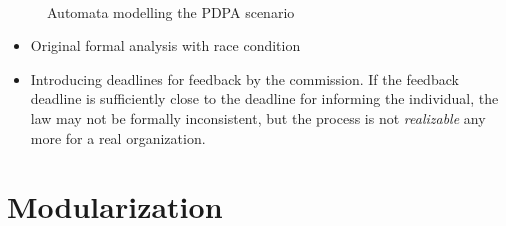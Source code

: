 \begin{figure}[htp]
\centering
{}\hfil
{}\\
\caption{Automata modelling the PDPA scenario}
\label{fig:pdpa}
\end{figure}


\begin{itemize}
\item Original formal analysis with race condition
\item Introducing deadlines for feedback by the commission. If the feedback deadline is
  sufficiently close to the deadline for informing the individual, the law may
  not be formally inconsistent, but the process is not \emph{realizable} any
  more for a real organization.
\end{itemize}

\section{Modularization}



